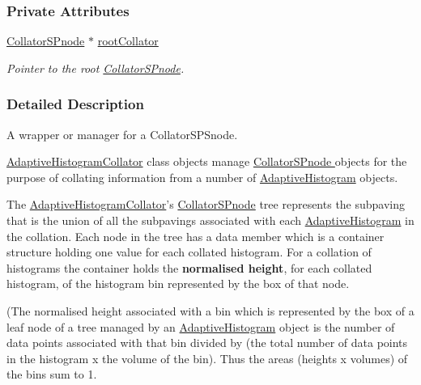 \subsubsection*{\-Private \-Attributes}
\begin{DoxyCompactItemize}
\item 
\hyperlink{classsubpavings_1_1CollatorSPnode}{\-Collator\-S\-Pnode} $\ast$ \hyperlink{classsubpavings_1_1AdaptiveHistogramCollator_a5ae0bb810e0f19142964b9508f799b60}{root\-Collator}
\begin{DoxyCompactList}\small\item\em \-Pointer to the root \hyperlink{classsubpavings_1_1CollatorSPnode}{\-Collator\-S\-Pnode}. \end{DoxyCompactList}\end{DoxyCompactItemize}


\subsubsection{\-Detailed \-Description}
\-A wrapper or manager for a \-Collator\-S\-P\-Snode. 

\hyperlink{classsubpavings_1_1AdaptiveHistogramCollator}{\-Adaptive\-Histogram\-Collator} class objects manage \hyperlink{classsubpavings_1_1CollatorSPnode}{\-Collator\-S\-Pnode } objects for the purpose of collating information from a number of \hyperlink{classsubpavings_1_1AdaptiveHistogram}{\-Adaptive\-Histogram} objects.

\-The \hyperlink{classsubpavings_1_1AdaptiveHistogramCollator}{\-Adaptive\-Histogram\-Collator}'s \hyperlink{classsubpavings_1_1CollatorSPnode}{\-Collator\-S\-Pnode} tree represents the subpaving that is the union of all the subpavings associated with each \hyperlink{classsubpavings_1_1AdaptiveHistogram}{\-Adaptive\-Histogram} in the collation. \-Each node in the tree has a data member which is a container structure holding one value for each collated histogram. \-For a collation of histograms the container holds the {\bfseries normalised height}, for each collated histogram, of the histogram bin represented by the box of that node.

(\-The normalised height associated with a bin which is represented by the box of a leaf node of a tree managed by an \hyperlink{classsubpavings_1_1AdaptiveHistogram}{\-Adaptive\-Histogram} object is the number of data points associated with that bin divided by (the total number of data points in the histogram x the volume of the bin). \-Thus the areas (heights x volumes) of the bins sum to 1.

